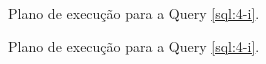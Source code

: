 \documentclass[a4paper,12pt]{article}
\begin{document}
\begin{figure}[hpt]
   \ContinuedFloat
   \begin{center}
      \\
   \end{center}
   \caption{Plano de execução para a Query \ref{sql:4-i}.}
\end{figure}

\begin{figure}[hpt]
   \ContinuedFloat
   \begin{center}
   \end{center}
   \caption{Plano de execução para a Query \ref{sql:4-i}.}
\end{figure}
\end{document}
